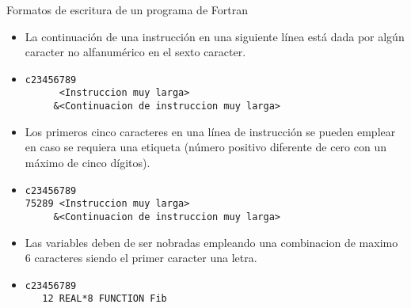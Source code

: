 \begin{frame}[fragile]{Formatos de escritura de un programa de Fortran}
   \begin{itemize}[<+(0)->]
   \item La continuación de una instrucción en una siguiente línea está dada por algún caracter no alfanumérico en el sexto caracter.
   \vspace{0.1cm}
   \item []
    \begin{verbatim} 
c23456789
      <Instruccion muy larga>
     &<Continuacion de instruccion muy larga>
    \end{verbatim}
   \item Los primeros cinco caracteres en una línea de instrucción se pueden emplear en caso se requiera una etiqueta (número positivo diferente de cero con un máximo de cinco dígitos).
   \vspace{0.1cm}
   \item []
    \begin{verbatim} 
c23456789
75289 <Instruccion muy larga>
     &<Continuacion de instruccion muy larga>
    \end{verbatim}
   \item Las variables deben de ser nobradas empleando una combinacion de maximo 6 caracteres siendo el primer caracter una letra.
   \item []
    \begin{verbatim} 
c23456789
   12 REAL*8 FUNCTION Fib
    \end{verbatim}
  \end{itemize}
\end{frame}